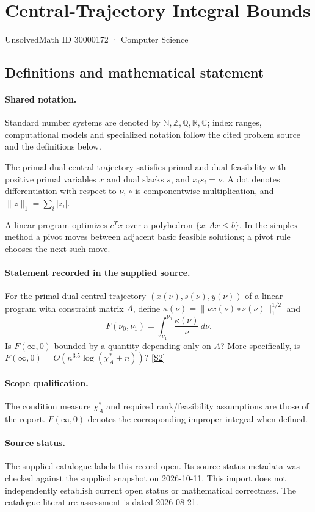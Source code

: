 \documentclass[11pt]{article}
\newcommand{\sref}[2]{\hyperlink{source:#1:#2}{[S#2]}}
\begin{document}
\setcounter{section}{30000171}
\section{Central-Trajectory Integral Bounds}\label{30000172}
{\small\sffamily UnsolvedMath ID 30000172 · Computer Science}
\subsection{Definitions and mathematical statement}

\paragraph{Shared notation.}Standard number systems are denoted by $\mathbb N,\mathbb Z,\mathbb Q,\mathbb R,\mathbb C$; index ranges, computational models and specialized notation follow the cited problem source and the definitions below.


The primal-dual central trajectory satisfies primal and dual feasibility with positive primal variables $x$ and dual slacks $s$, and $x_i s_i=\nu$. A dot denotes differentiation with respect to $\nu$, $\circ$ is componentwise multiplication, and $\lVert z\rVert_1=\sum_i|z_i|$.

A linear program optimizes $c^Tx$ over a polyhedron $\{x:Ax\leq b\}$. In the simplex method a pivot moves between adjacent basic feasible solutions; a pivot rule chooses the next such move.
\paragraph{Statement recorded in the supplied source.}
For the primal-dual central trajectory $(x(\nu),s(\nu),y(\nu))$ of a linear program with constraint matrix $A$, define $\kappa(\nu)=\lVert\nu\dot x(\nu)\circ\dot s(\nu)\rVert_1^{1/2}$ and $$F(\nu_0,\nu_1)=\int_{\nu_1}^{\nu_0}\frac{\kappa(\nu)}{\nu}\,d\nu.$$ Is $F(\infty,0)$ bounded by a quantity depending only on $A$? More specifically, is $F(\infty,0)=O\!\left(n^{3.5}\log(\bar\chi_A^*+n)\right)$? \sref{30000172}{2}
\paragraph{Scope qualification.}
The condition measure $\bar\chi_A^*$ and required rank/feasibility assumptions are those of the report. $F(\infty,0)$ denotes the corresponding improper integral when defined.
\paragraph{Source status.}
The supplied catalogue labels this record open. Its source-status metadata was checked against the supplied snapshot on 2026-10-11. This import does not independently establish current open status or mathematical correctness. The catalogue literature assessment is dated 2026-08-21.
\end{document}

